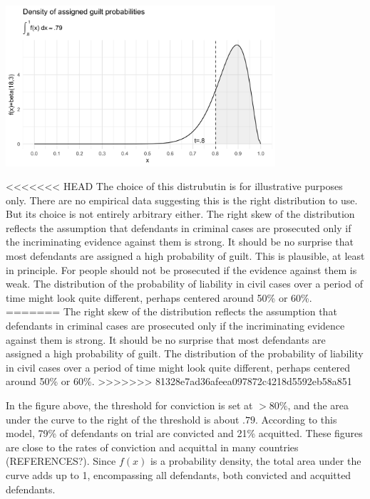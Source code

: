 \documentclass[10pt,dvipsnames,enabledeprecatedfontcommands]{scrartcl}
\begin{document}
\begin{center}
    \includegraphics[width=10cm]{beta(18,3)2.png}
\end{center}

<<<<<<< HEAD
\noindent The choice of this distrubutin is for illustrative purposes
only. There are no empirical data suggesting this is the right
distribution to use. But its choice is not entirely arbitrary either.
The right skew of the distribution reflects the assumption that
defendants in criminal cases are prosecuted only if the incriminating
evidence against them is strong. It should be no surprise that most
defendants are assigned a high probability of guilt. This is plausible,
at least in principle. For people should not be prosecuted if the
evidence against them is weak. The distribution of the probability of
liability in civil cases over a period of time might look quite
different, perhaps centered around 50\% or 60\%.
=======
\noindent The right skew of the distribution reflects the assumption
that defendants in criminal cases are prosecuted only if the
incriminating evidence against them is strong. It should be no surprise
that most defendants are assigned a high probability of guilt. The
distribution of the probability of liability in civil cases over a
period of time might look quite different, perhaps centered around 50\%
or 60\%.
>>>>>>> 81328e7ad36afeea097872c4218d5592eb58a851

In the figure above, the threshold for conviction is set at \(>80\%\),
and the area under the curve to the right of the threshold is about
\(.79\). According to this model, 79\% of defendants on trial are
convicted and 21\% acquitted. These figures are close to the rates of
conviction and acquittal in many countries (REFERENCES?). Since \(f(x)\)
is a probability density, the total area under the curve adds up to 1,
encompassing all defendants, both convicted and acquitted defendants.
\end{document}
